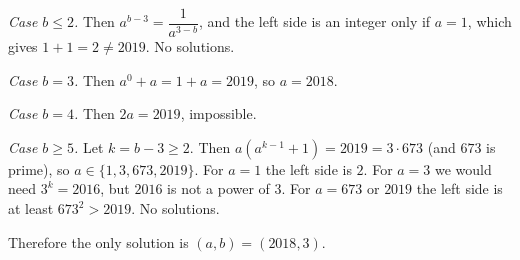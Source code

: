 \emph{Case $b\le2$.} Then $a^{b-3}=\dfrac{1}{a^{3-b}}$, and the left side is an integer only if $a=1$, which gives $1+1=2\ne2019$. No solutions.

\emph{Case $b=3$.} Then $a^0+a=1+a=2019$, so $a=2018$.

\emph{Case $b=4$.} Then $2a=2019$, impossible.

\emph{Case $b\ge5$.} Let $k=b-3\ge2$. Then $a\left(a^{k-1}+1\right)=2019=3\cdot673$ (and $673$ is prime), so $a\in\{1,3,673,2019\}$. For $a=1$ the left side is $2$. For $a=3$ we would need $3^k=2016$, but $2016$ is not a power of $3$. For $a=673$ or $2019$ the left side is at least $673^2>2019$. No solutions.

Therefore the only solution is $\boxed{(a,b)=(2018,3)}$.
